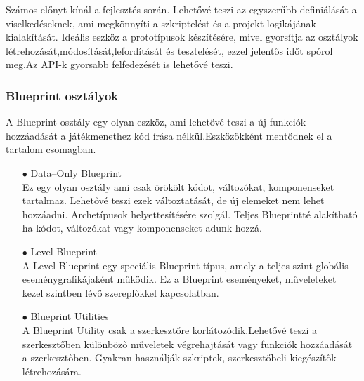 \documentclass[
]{thesis-ekf}
\theoremstyle{definition}
\theoremstyle{remark}
\begin{document}
Számos előnyt kínál a fejlesztés során. Lehetővé teszi az egyszerűbb definiálását a viselkedéseknek, ami megkönnyíti a szkriptelést és a projekt logikájának kialakítását. Ideális eszköz a prototípusok készítésére, mivel gyorsítja az osztályok létrehozását,módosítását,lefordítását és tesztelését, ezzel jelentős időt spórol meg.Az API-k gyorsabb felfedezését is lehetővé teszi.\cite{UnrealBlueprint}
\subsubsection{Blueprint osztályok}
A Blueprint osztály egy olyan eszköz, ami lehetővé teszi a új funkciók hozzáadását a játékmenethez kód írása nélkül.Eszközökként mentődnek el a tartalom csomagban.\cite{UnrealBlueprintClasses}
\begin{itemize}
	\item[$\bullet$] Data--Only Blueprint \\ Ez egy olyan osztály ami csak örökölt kódot, változókat, komponenseket tartalmaz. Lehetővé teszi ezek változtatását, de új elemeket nem lehet hozzáadni. Archetípusok helyettesítésére szolgál. Teljes Blueprintté alakítható ha kódot, változókat vagy komponenseket adunk hozzá.
	\item[$\bullet$] Level Blueprint \\ A Level Blueprint egy speciális Blueprint típus, amely a teljes szint globális eseménygrafikájaként működik. Ez a Blueprint eseményeket, műveleteket kezel szintben lévő szereplőkkel kapcsolatban.
	\item[$\bullet$] Blueprint Utilities \\ A Blueprint Utility csak a szerkesztőre korlátozódik.Lehetővé teszi a szerkesztőben különböző  műveletek végrehajtását vagy funkciók hozzáadását a szerkesztőben. Gyakran használják szkriptek, szerkesztőbeli kiegészítők létrehozására. 
\end{itemize}
\end{document}
